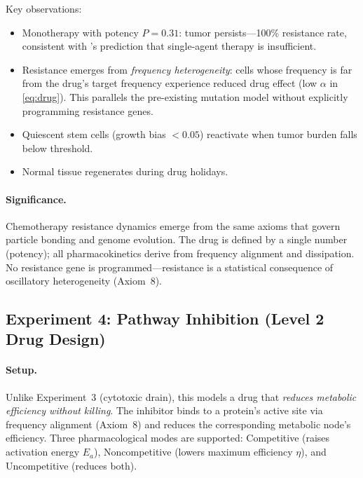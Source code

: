 \documentclass[11pt,a4paper]{article}
\begin{document}
Key observations:
\begin{itemize}
  \item Monotherapy with potency $P = 0.31$:
        tumor persists---100\% resistance rate, consistent with
        \citeauthor{bozic2013evolutionary}'s prediction
        that single-agent therapy is insufficient.
  \item Resistance emerges from \emph{frequency heterogeneity}:
        cells whose frequency is far from the drug's target
        frequency experience reduced drug effect
        (low $\alpha$ in \cref{eq:drug}). This parallels
        the pre-existing mutation model without explicitly
        programming resistance genes.
  \item Quiescent stem cells (growth bias $< 0.05$)
        reactivate when tumor burden falls below threshold.
  \item Normal tissue regenerates during drug holidays.
\end{itemize}

\paragraph{Significance.}
Chemotherapy resistance dynamics emerge from the same axioms
that govern particle bonding and genome evolution.
The drug is defined by a single number (potency);
all pharmacokinetics derive from frequency alignment
and dissipation. No resistance gene is programmed---resistance
is a statistical consequence of oscillatory heterogeneity
(Axiom~8).


\subsection{Experiment 4: Pathway Inhibition (Level 2 Drug Design)}

\paragraph{Setup.}
Unlike Experiment~3 (cytotoxic drain), this models a drug that
\emph{reduces metabolic efficiency without killing}.
The inhibitor binds to a protein's active site via frequency
alignment (Axiom~8) and reduces the corresponding metabolic
node's efficiency. Three pharmacological modes are supported:
Competitive (raises activation energy $E_a$),
Noncompetitive (lowers maximum efficiency $\eta$),
and Uncompetitive (reduces both).
\end{document}
